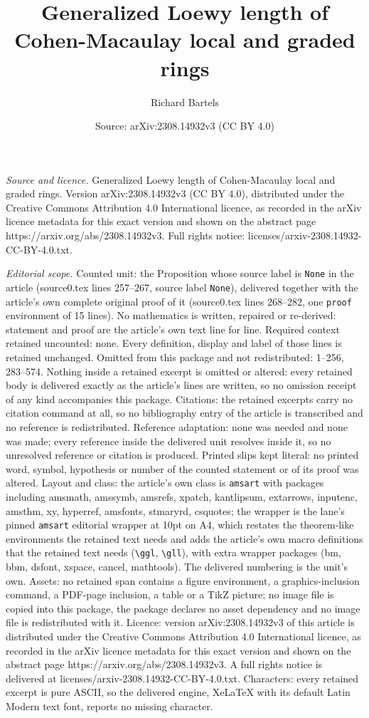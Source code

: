 \documentclass[10pt,a4paper]{amsart}
\title[Generalized Loewy length of Cohen-Macaulay local and graded ]{Generalized Loewy length of Cohen-Macaulay local and graded rings}
\author{Richard Bartels}
\date{Source: arXiv:2308.14932v3 (CC BY 4.0)}
\begin{document}
\maketitle

\noindent\emph{Source and licence.} Generalized Loewy length of Cohen-Macaulay local and graded rings. Version arXiv:2308.14932v3 (CC BY 4.0), distributed under the Creative Commons Attribution 4.0 International licence, as recorded in the arXiv licence metadata for this exact version and shown on the abstract page https://arxiv.org/abs/2308.14932v3. Full rights notice: licenses/arxiv-2308.14932-CC-BY-4.0.txt.\par\smallskip

\noindent\textit{Editorial scope.} Counted unit: the Proposition whose source label is \texttt{None} in the article (source0.tex lines 257--267, source label \texttt{None}), delivered together with the article's own complete original proof of it (source0.tex lines 268--282, one \texttt{proof} environment of 15 lines). No mathematics is written, repaired or re-derived: statement and proof are the article's own text line for line. Required context retained uncounted: none. Every definition, display and label of those lines is retained unchanged. Omitted from this package and not redistributed: 1--256, 283--574. Nothing inside a retained excerpt is omitted or altered: every retained body is delivered exactly as the article's lines are written, so no omission receipt of any kind accompanies this package. Citations: the retained excerpts carry no citation command at all, so no bibliography entry of the article is transcribed and no reference is redistributed. Reference adaptation: none was needed and none was made; every reference inside the delivered unit resolves inside it, so no unresolved reference or citation is produced. Printed slips kept literal: no printed word, symbol, hypothesis or number of the counted statement or of its proof was altered. Layout and class: the article's own class is \texttt{amsart} with packages including amsmath, amssymb, amsrefs, xpatch, kantlipsum, extarrows, inputenc, amsthm, xy, hyperref, amsfonts, stmaryrd, csquotes; the wrapper is the lane's pinned \texttt{amsart} editorial wrapper at 10pt on A4, which restates the theorem-like environments the retained text needs and adds the article's own macro definitions that the retained text needs (\texttt{\textbackslash ggl}, \texttt{\textbackslash gll}), with extra wrapper packages (bm, bbm, dsfont, xspace, cancel, mathtools). The delivered numbering is the unit's own. Assets: no retained span contains a figure environment, a graphics-inclusion command, a PDF-page inclusion, a table or a TikZ picture; no image file is copied into this package, the package declares no asset dependency and no image file is redistributed with it. Licence: version arXiv:2308.14932v3 of this article is distributed under the Creative Commons Attribution 4.0 International licence, as recorded in the arXiv licence metadata for this exact version and shown on the abstract page https://arxiv.org/abs/2308.14932v3. A full rights notice is delivered at licenses/arxiv-2308.14932-CC-BY-4.0.txt. Characters: every retained excerpt is pure ASCII, so the delivered engine, XeLaTeX with its default Latin Modern text font, reports no missing character.
\end{document}
